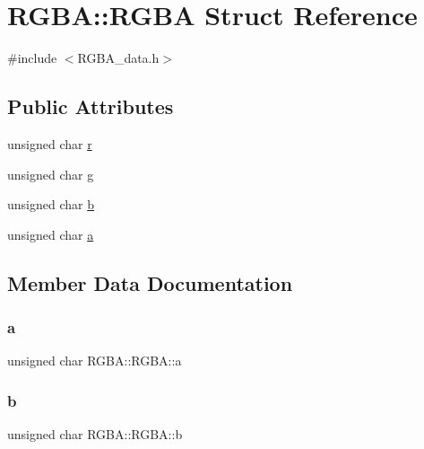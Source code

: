 \hypertarget{struct_r_g_b_a_1_1_r_g_b_a}{}\section{R\+G\+BA\+:\+:R\+G\+BA Struct Reference}
\label{struct_r_g_b_a_1_1_r_g_b_a}


{\ttfamily \#include $<$R\+G\+B\+A\+\_\+data.\+h$>$}

\subsection*{Public Attributes}
\begin{DoxyCompactItemize}
\item 
unsigned char \mbox{\hyperlink{struct_r_g_b_a_1_1_r_g_b_a_a87b888c8a942657465245278e56fbdcb}{r}}
\item 
unsigned char \mbox{\hyperlink{struct_r_g_b_a_1_1_r_g_b_a_a00a209d9b4551824af7ab9fbd42d58c9}{g}}
\item 
unsigned char \mbox{\hyperlink{struct_r_g_b_a_1_1_r_g_b_a_ab6caa83b58d19dab14189a71a99c1156}{b}}
\item 
unsigned char \mbox{\hyperlink{struct_r_g_b_a_1_1_r_g_b_a_a6d14ac2c5bbc8385cad996d204aa06c6}{a}}
\end{DoxyCompactItemize}


\subsection{Member Data Documentation}
\mbox{\label{struct_r_g_b_a_1_1_r_g_b_a_a6d14ac2c5bbc8385cad996d204aa06c6}} 
\subsubsection{\texorpdfstring{a}{a}}
{\footnotesize\ttfamily unsigned char R\+G\+B\+A\+::\+R\+G\+B\+A\+::a}

\mbox{\label{struct_r_g_b_a_1_1_r_g_b_a_ab6caa83b58d19dab14189a71a99c1156}} 
\subsubsection{\texorpdfstring{b}{b}}
{\footnotesize\ttfamily unsigned char R\+G\+B\+A\+::\+R\+G\+B\+A\+::b}

